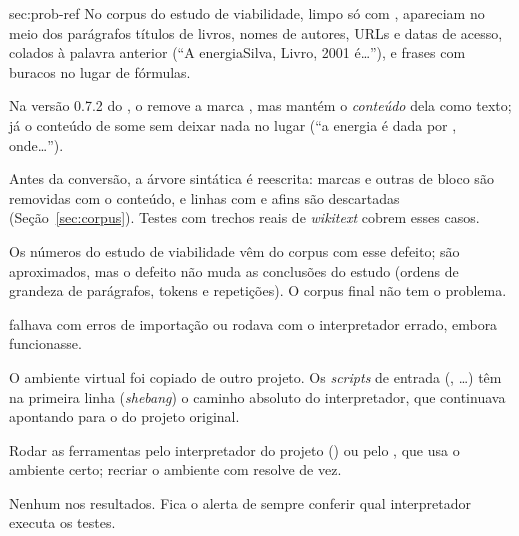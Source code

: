 {sec:prob-ref}
{No corpus do estudo de viabilidade, limpo só com , apareciam no meio dos
parágrafos títulos de livros, nomes de autores, URLs e datas de acesso, colados à palavra
anterior (``A energiaSilva, Livro, 2001 é\ldots''), e frases com buracos no lugar de fórmulas.}
{\item[Causa.] Na versão 0.7.2 do , o  remove a marca
, mas mantém o \emph{conteúdo} dela como texto; já o conteúdo de  some
sem deixar nada no lugar (``a energia é dada por , onde\ldots'').
\item[Solução.] Antes da conversão, a árvore sintática é reescrita: marcas  e outras
de bloco são removidas com o conteúdo, e linhas com  e afins são descartadas
(Seção~\ref{sec:corpus}). Testes com trechos reais de \emph{wikitext} cobrem esses casos.}
{Os números do estudo de viabilidade vêm do corpus com esse defeito; são aproximados, mas o
defeito não muda as conclusões do estudo (ordens de grandeza de parágrafos, tokens e
repetições). O corpus final não tem o problema.}

{ falhava com erros de importação ou rodava com o interpretador errado,
embora  funcionasse.}
{\item[Causa.] O ambiente virtual foi copiado de outro projeto. Os \emph{scripts} de entrada
(, \ldots) têm na primeira linha (\emph{shebang}) o caminho absoluto do
interpretador, que continuava apontando para o  do projeto original.
\item[Solução.] Rodar as ferramentas pelo interpretador do projeto
() ou pelo , que usa o ambiente certo; recriar o
ambiente com  resolve de vez.}
{Nenhum nos resultados. Fica o alerta de sempre conferir qual interpretador executa os testes.}
